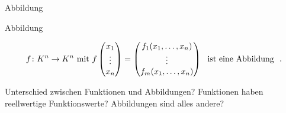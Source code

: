 \documentclass[class=article, crop=false]{standalone}
\begin{document}
\begin{zettel}{Abbildung}
\begin{flashcard}[9i52y6ko]{Abbildung}
	\begin{definition}[Abbildung]
		\[
			f \from K^n\to  K^n \tx{mit} f \begin{pmatrix}
				x_1    \\
				\vdots \\
				x_n    \\
			\end{pmatrix} =
			\begin{pmatrix}
				f_1 (x_1, \dots , x_n) \\
				\vdots                 \\
				f_m (x_1, \dots, x_n)  \\
			\end{pmatrix} \tx{ ist eine Abbildung }
		.\]

	\end{definition}
\end{flashcard}

Unterschied zwischen Funktionen und Abbildungen? Funktionen haben reellwertige Funktionswerte? Abbildungen sind alles andere?
\end{zettel}
\end{document}
